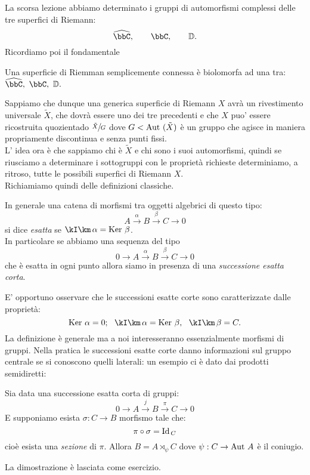 
La scorsa lezione abbiamo determinato i gruppi di automorfismi complessi delle tre superfici di Riemann:
$$
\hat{\bbC},\qquad \bbC, \qquad \mathbb{D}.
$$
Ricordiamo poi il fondamentale
\begin{teorema}[Riemann] Una superficie di Riemman semplicemente connessa è biolomorfa ad una tra:
$\hat{\bbC},\ \bbC, \ \mathbb{D}. $
\end{teorema}
Sappiamo che dunque una generica superficie di Riemann $X$ avrà un rivestimento universale $\tilde{X}$, che dovrà essere uno dei tre precedenti e che $X$ puo' essere ricostruita quozientado $\sfrac{\tilde{X}}{G}$ dove $G<\text{Aut }(\tilde{X})$ è un gruppo che agisce in maniera propriamente discontinua e senza punti fissi.\\
L' idea ora è che sappiamo chi è $\tilde{X}$ e chi sono i suoi automorfismi, quindi se riusciamo a determinare i sottogruppi con le proprietà richieste determiniamo, a ritroso, tutte le possibili superfici di Riemann $X$.\\

Richiamiamo quindi delle definizioni classiche.

\begin{definizione} In generale una catena di morfismi tra oggetti algebrici di questo tipo:
$$
A\xrightarrow{\alpha}B\xrightarrow{\beta}C\rightarrow 0
$$
si dice {\it esatta} se $\Im{\alpha}=\Ker{\beta}$.\\
In particolare se abbiamo una sequenza del tipo
$$
0\rightarrow A\xrightarrow{\alpha}B\xrightarrow{\beta}C \rightarrow 0
$$ 
che è esatta in ogni punto allora siamo in presenza di una {\it successione esatta corta}.
\end{definizione}
E' opportuno osservare che le successioni esatte corte sono caratterizzate dalle proprietà:
$$
\Ker \alpha =0;\ \ \Im \alpha =\Ker \beta,\ \ \Im \beta =C.
$$
La definizione è generale ma a noi interesseranno essenzialmente morfismi di gruppi.
Nella pratica le successioni esatte corte danno informazioni sul gruppo centrale se si conoscono quelli laterali: un esempio ci è dato dai prodotti semidiretti:
\begin{fatto}
Sia data una successione esatta corta di gruppi:
$$
0\rightarrow A\xrightarrow{j}B\xrightarrow{\pi}C \rightarrow 0
$$
E supponiamo esista $\sigma:C\rightarrow B$ morfismo tale che:
$$
\pi\circ \sigma=\text{Id}_{\, C} 
$$
cioè esista  una {\it sezione} di $\pi$. Allora $B=A\rtimes_\psi C$ dove $\psi:C
\rightarrow \text{Aut } A$ è il coniugio.
\end{fatto}
La dimostrazione è lasciata come esercizio.

